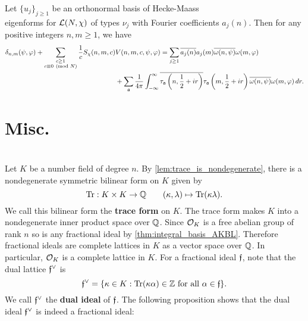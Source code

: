 \documentclass[12pt,oneside]{book}
\begin{document}
    \begin{theorem}
      Let $\{u_{j}\}_{j \ge 1}$ be an orthonormal basis of Hecke-Maass \\ eigenforms for $\mathcal{L}(N,\chi)$ of types $\nu_{j}$ with Fourier coefficients $a_{j}(n)$. Then for any positive integers $n,m \ge 1$, we have
      \begin{align*}
        \delta_{n,m}(\psi,\varphi)+\sum_{\substack{c \ge 1 \\ c \equiv 0 \ \left(\text{mod }N\right)}}\frac{1}{c}S_{\chi}(n,m,c)&V(n,m,c,\psi,\varphi) = \sum_{j \ge 1}\overline{a_{j}(n)}a_{j}(m)\overline{\omega(n,\psi)}\omega(m,\varphi) \\
        &+\sum_{\mathfrak{a}}\frac{1}{4\pi}\int_{-\infty}^{\infty}\overline{\tau_{\mathfrak{a}}\left(n,\frac{1}{2}+ir\right)}\tau_{\mathfrak{a}}\left(m,\frac{1}{2}+ir\right)\overline{\omega(n,\psi)}\omega(m,\varphi)\,dr.
      \end{align*}
    \end{theorem}
  \section{Misc.}
  \section{}
    Let $K$ be a number field of degree $n$. By \cref{lem:trace_is_nondegenerate}, there is a nondegenerate symmetric bilinear form on $K$ given by
    \[
      \operatorname{\mathrm{Tr}}:K \times K \to \mathbb{Q} \qquad (\kappa,\lambda) \mapsto \operatorname{\mathrm{Tr}}(\kappa\lambda).
    \]
    We call this bilinear form the \textbf{trace form} on $K$. The trace form makes $K$ into a nondegenerate inner product space over $\mathbb{Q}$. Since $\mathcal{O}_{K}$ is a free abelian group of rank $n$ so is any fractional ideal by \cref{thm:integral_basis_AKBL}. Therefore fractional ideals are complete lattices in $K$ as a vector space over $\mathbb{Q}$. In particular, $\mathcal{O}_{K}$ is a complete lattice in $K$. For a fractional ideal $\mathfrak{f}$, note that the dual lattice $\mathfrak{f}^{\vee}$ is
    \[
      \mathfrak{f}^{\vee} = \{\kappa \in K:\text{$\operatorname{\mathrm{Tr}}(\kappa \alpha) \in \mathbb{Z}$ for all $\alpha \in \mathfrak{f}$}\}.
    \]
    We call $\mathfrak{f}^{\vee}$ the \textbf{dual ideal} of $\mathfrak{f}$. The following proposition shows that the dual ideal $\mathfrak{f}^{\vee}$ is indeed a fractional ideal:
\end{document}
